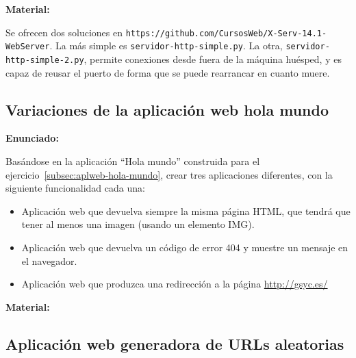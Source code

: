 \textbf{Material:}

Se ofrecen dos soluciones en \verb|https://github.com/CursosWeb/X-Serv-14.1-WebServer|. La más simple es \verb|servidor-http-simple.py|. La otra, \verb|servidor-http-simple-2.py|, permite conexiones desde fuera de la máquina huésped, y es capaz de reusar el puerto de forma que se puede rearrancar en cuanto muere.


\subsection{Variaciones de la aplicación web hola mundo}
\label{subsec:aplweb-hola-mundo-var}

\textbf{Enunciado:}

Basándose en la aplicación ``Hola mundo'' construida para el ejercicio~\ref{subsec:aplweb-hola-mundo}, crear tres aplicaciones diferentes, con la siguiente funcionalidad cada una:

\begin{itemize}
\item Aplicación web que devuelva siempre la misma página HTML, que tendrá que tener al menos una imagen (usando un elemento IMG).

\item Aplicación web que devuelva un código de error 404 y muestre un mensaje en el navegador.

\item Aplicación web que produzca una redirección a la página \url{http://gsyc.es/}
\end{itemize}

\textbf{Material:}



\subsection{Aplicación web generadora de URLs aleatorias}
\label{subsec:aplweb-urls-aleatorias}

